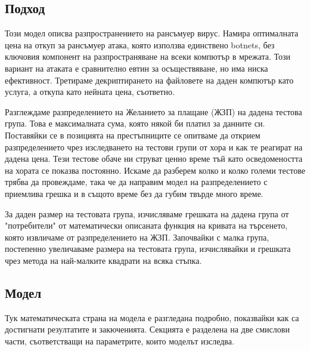 \documentclass[11pt, a4paper]{article}
\theoremstyle{definition}
\begin{document}
		\subsection{Подход}
			Този модел описва разпространението на рансъмуер вирус. Намира оптималната цена на откуп за рансъмуер атака, която използва единствено botnets, без ключовия компонент на разпространяване на всеки компютър в мрежата. Този вариант на атаката е сравнително евтин за осъществяване, но има ниска ефективност. Третираме декриптирането на файловете на даден компютър като услуга, а откупа като нейната цена, съответно. \par
			Разглеждаме разпределението на Желанието за плащане (ЖЗП) на дадена тестова група. Това е максималната сума, която някой би платил за данните си. Поставяйки се в позицията на престъпниците се опитваме да открием разпределението чрез изследването на тестови групи от хора и как те реагират на дадена цена. Тези тестове обаче ни струват ценно време тъй като осведомеността на хората се показва постоянно. Искаме да разберем колко и колко големи тестове трябва да провеждаме, така че да направим модел на разпределението с приемлива грешка и в същото време без да губим твърде много време.\par
			За даден размер на тестовата група, изчисляваме грешката на дадена група от "потребители" от математически описаната функция на кривата на търсенето, която извличаме от разпределението на ЖЗП. Започвайки с малка група, постепенно увеличаваме размера на тестовата група, изчислявайки и грешката чрез метода на най-малките квадрати на всяка стъпка.
		\subsection{Модел}
			Тук математическата страна на модела е разгледана подробно, показвайки как са достигнати резултатите и закюченията. Секцията е разделена на две смислови части, съответстващи на параметрите, които моделът изследва.
\end{document}
